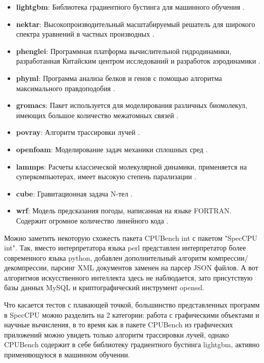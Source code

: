 \begin{itemize}
	\item  \textbf{lightgbm}: Библиотека градиентного бустинга для машинного обучения \cite{ke2017lightgbm}.
	\item  \textbf{nektar}: Высокопроизводительный масштабируемый решатель для широкого спектра уравнений в частных производных \cite{cantwell2015nektar++}.
	\item  \textbf{phenglei}: Программная платформа вычислительной гидродинамики, разработанная Китайским центром исследований и разработок аэродинамики \cite{zhao2020design}.
	\item  \textbf{phyml}: Программа анализа белков и генов с помощью алгоритма максимального правдоподобия \cite{guindon2010new}.
	\item  \textbf{gromacs}: Пакет используется для моделирования различных биомолекул, имеющих большое количество межатомных связей \cite{van2005gromacs}.
	\item  \textbf{povray}: Алгоритм трассировки лучей \cite{plachetka1998pov}.
	\item  \textbf{openfoam}: Моделирование задач механики сплошных сред \cite{jasak2009openfoam}. 
	\item  \textbf{lammps}: Расчеты классической молекулярной динамики, применяется на суперкомпьютерах, имеет высокую степень парализации \cite{gowthaman2023review}.
	\item  \textbf{cube}: Гравитационная задача N-тел \cite{yu2018cube}.
	\item  \textbf{wrf}: Модель предсказания погоды, написанная на языке FORTRAN. Содержит огромное количество линейного кода \cite{skamarock2019description}. 	        
\end{itemize}

Можно заметить некоторую схожесть пакета CPUBench int с пакетом "SpecCPU int". Так, вместо интерпретатора языка perl представлен интерпретатор более современного языка python, добавлен дополнительный алгоритм компрессии/декомпрессии, парсинг XML документов заменен на парсер JSON файлов. А вот алгоритмов искусственного интеллекта здесь не наблюдается, зато присутствую базы данных MySQL и криптографический инструмент openssl.

Что касается тестов с плавающей точкой, большинство представленных программ в SpecCPU можно разделить на 2 категории: работа с графическими объектами и научные вычисления, в то время как в пакете CPUBench из графических приложений можно увидеть только алгоритм трассировки лучей, однако CPUBench содержит в себе библиотеку градиентного бустинга lightgbm, активно применяющуюся в машинном обучении. 

